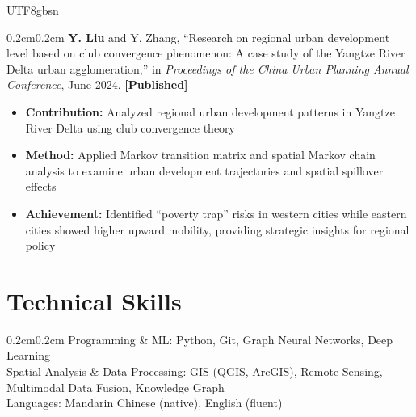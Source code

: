 \documentclass[10pt, letterpaper]{article}
\newenvironment{highlights}{
    \begin{itemize}[
        topsep=0.01cm, parsep=0.01cm, partopsep=0pt, itemsep=0pt,
        leftmargin=2.1em, labelwidth=2em, labelsep=0em,
        align=left
    ]
}{\end{itemize}}
\newenvironment{onecolentry}{\begin{adjustwidth}{0.2cm}{0.2cm}}{\end{adjustwidth}}
\begin{document}
\begin{CJK*}{UTF8}{gbsn}
\vspace{0.15cm}

\begin{onecolentry}
\textbf{Y. Liu} and Y. Zhang, ``Research on regional urban development level based on club convergence phenomenon: A case study of the Yangtze River Delta urban agglomeration,'' in \textit{Proceedings of the China Urban Planning Annual Conference}, June 2024. \textbf{[Published]}
  \begin{highlights}
    \item \textbf{Contribution:} Analyzed regional urban development patterns in Yangtze River Delta using club convergence theory\\[-12pt]
    \item \textbf{Method:} Applied Markov transition matrix and spatial Markov chain analysis to examine urban development trajectories and spatial spillover effects\\[-12pt]
    \item \textbf{Achievement:} Identified ``poverty trap'' risks in western cities while eastern cities showed higher upward mobility, providing strategic insights for regional policy
  \end{highlights}
\end{onecolentry}

\section{Technical Skills}
\begin{onecolentry}
    Programming \& ML: Python, Git, Graph Neural Networks, Deep Learning \\
    Spatial Analysis \& Data Processing: GIS (QGIS, ArcGIS), Remote Sensing, Multimodal Data Fusion, Knowledge Graph \\
    Languages: Mandarin Chinese (native), English (fluent)
\end{onecolentry}


\end{CJK*}
\end{document}
